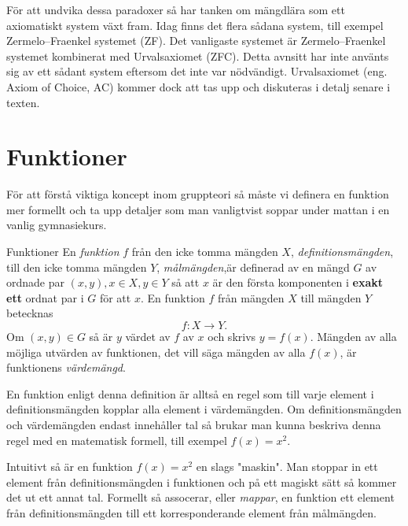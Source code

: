 \documentclass{article}
\theoremstyle{definition}
\begin{document}
För att undvika dessa paradoxer så har tanken om mängdlära som ett axiomatiskt system växt fram. 
Idag finns det flera sådana system, till exempel Zermelo–Fraenkel systemet (ZF). Det vanligaste 
systemet är Zermelo–Fraenkel systemet kombinerat med Urvalsaxiomet (ZFC). Detta avnsitt har inte använts sig 
av ett sådant system eftersom det inte var nödvändigt. 
Urvalsaxiomet (eng. Axiom of Choice, AC) kommer dock att 
tas upp och diskuteras i detalj senare i texten.

\section{Funktioner}
För att förstå viktiga koncept inom gruppteori så måste vi definera en funktion mer formellt och ta upp detaljer som man vanligtvist soppar under mattan i en vanlig gymnasiekurs.

\begin{mydef}{Funktioner}{}
  En \textit{funktion} $f$ från den icke tomma mängden $X$, \textit{definitionsmängden}, till den icke tomma mängden $Y$, \textit{målmängden},är definerad 
  av en mängd $G$ av ordnade par $(x, y), x \in X, y \in Y$ så att $x$ är den första komponenten i \textbf{exakt ett} ordnat par i $G$ för att $x$. En funktion $f$ från mängden $X$
  till mängden $Y$ betecknas
  \[f: X \rightarrow Y.\]
  Om $(x, y) \in G$ så är $y$ värdet av $f$ av $x$ och skrivs $y=f(x)$. Mängden av alla möjliga utvärden av funktionen, det vill säga mängden av alla $f(x)$, är funktionens \textit{värdemängd}.
\end{mydef}

En funktion enligt denna definition är alltså en regel som till varje element i definitionsmängden kopplar alla element i värdemängden. Om definitionsmängden och värdemängden endast innehåller
tal så brukar man kunna beskriva denna regel med en matematisk formell, till exempel $f(x) = x^2$.

Intuitivt så är en funktion $f(x) = x^2$ en slags "maskin". Man stoppar in ett element från definitionsmängden i funktionen och på ett magiskt sätt så kommer det ut ett annat tal. Formellt så assocerar,
eller \textit{mappar}, en funktion ett element från definitionsmängden till ett korresponderande element från målmängden.


\begin{center}
\end{center}
\end{document}
